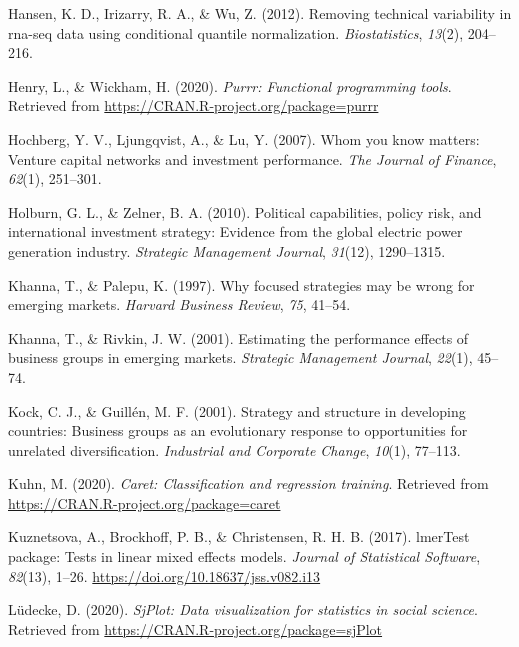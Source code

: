 \documentclass[
  english,
  man]{apa6}
\begin{document}
\leavevmode\hypertarget{ref-hansen2012removing}{}%
Hansen, K. D., Irizarry, R. A., \& Wu, Z. (2012). Removing technical variability in rna-seq data using conditional quantile normalization. \emph{Biostatistics}, \emph{13}(2), 204--216.

\leavevmode\hypertarget{ref-R-purrr}{}%
Henry, L., \& Wickham, H. (2020). \emph{Purrr: Functional programming tools}. Retrieved from \url{https://CRAN.R-project.org/package=purrr}

\leavevmode\hypertarget{ref-hochberg2007whom}{}%
Hochberg, Y. V., Ljungqvist, A., \& Lu, Y. (2007). Whom you know matters: Venture capital networks and investment performance. \emph{The Journal of Finance}, \emph{62}(1), 251--301.

\leavevmode\hypertarget{ref-holburn2010political}{}%
Holburn, G. L., \& Zelner, B. A. (2010). Political capabilities, policy risk, and international investment strategy: Evidence from the global electric power generation industry. \emph{Strategic Management Journal}, \emph{31}(12), 1290--1315.

\leavevmode\hypertarget{ref-khanna1997focused}{}%
Khanna, T., \& Palepu, K. (1997). Why focused strategies may be wrong for emerging markets. \emph{Harvard Business Review}, \emph{75}, 41--54.

\leavevmode\hypertarget{ref-khanna2001estimating}{}%
Khanna, T., \& Rivkin, J. W. (2001). Estimating the performance effects of business groups in emerging markets. \emph{Strategic Management Journal}, \emph{22}(1), 45--74.

\leavevmode\hypertarget{ref-kock2001strategy}{}%
Kock, C. J., \& Guillén, M. F. (2001). Strategy and structure in developing countries: Business groups as an evolutionary response to opportunities for unrelated diversification. \emph{Industrial and Corporate Change}, \emph{10}(1), 77--113.

\leavevmode\hypertarget{ref-R-caret}{}%
Kuhn, M. (2020). \emph{Caret: Classification and regression training}. Retrieved from \url{https://CRAN.R-project.org/package=caret}

\leavevmode\hypertarget{ref-R-lmerTest}{}%
Kuznetsova, A., Brockhoff, P. B., \& Christensen, R. H. B. (2017). lmerTest package: Tests in linear mixed effects models. \emph{Journal of Statistical Software}, \emph{82}(13), 1--26. \url{https://doi.org/10.18637/jss.v082.i13}

\leavevmode\hypertarget{ref-R-sjPlot}{}%
Lüdecke, D. (2020). \emph{SjPlot: Data visualization for statistics in social science}. Retrieved from \url{https://CRAN.R-project.org/package=sjPlot}
\end{document}
